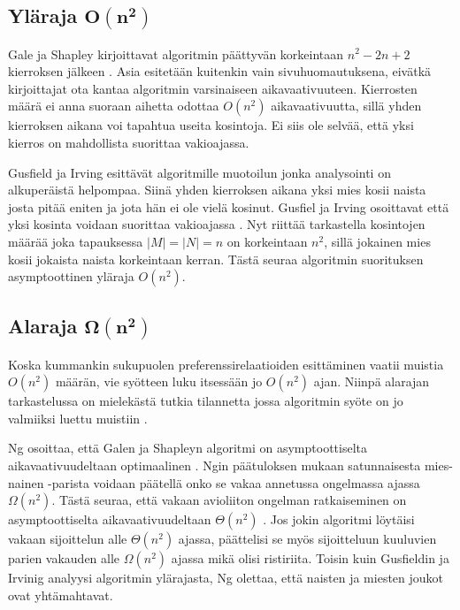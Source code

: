 \documentclass[gradu, twoside]{tktltiki}
\begin{document}
\subsection{Yläraja $\boldsymbol{O(n^2)}$}

Gale ja Shapley kirjoittavat algoritmin päättyvän korkeintaan $n^2 -
2n + 2$ kierroksen jälkeen \cite{galeshapley62}. Asia esitetään
kuitenkin vain sivuhuomautuksena, eivätkä kirjoittajat ota kantaa
algoritmin varsinaiseen aikavaativuuteen. Kierrosten määrä ei anna
suoraan aihetta odottaa $O(n^2)$ aikavaativuutta, sillä yhden
kierroksen aikana voi tapahtua useita kosintoja. Ei siis ole selvää,
että yksi kierros on mahdollista suorittaa
vakioajassa. \enlargethispage{\baselineskip}

Gusfield ja Irving esittävät algoritmille muotoilun \cite[sivu
  9]{gusfield89} jonka analysointi on alkuperäistä helpompaa. Siinä
yhden kierroksen aikana yksi mies kosii naista josta pitää eniten ja
jota hän ei ole vielä kosinut. Gusfiel ja Irving osoittavat että yksi
kosinta voidaan suorittaa vakioajassa \cite[sivu 14]{gusfield89}. Nyt
riittää tarkastella kosintojen määrää joka tapauksessa $|M| = |N| = n$
on korkeintaan $n^2$, sillä jokainen mies kosii jokaista naista
korkeintaan kerran. Tästä seuraa algoritmin suorituksen asymptoottinen
yläraja $O(n^2)$. \cite[sivu 14]{gusfield89}

\subsection{Alaraja $\boldsymbol{\Omega(n^2)}$}

Koska kummankin sukupuolen preferenssirelaatioiden esittäminen vaatii
muistia $O(n^2)$ määrän, vie syötteen luku itsessään jo $O(n^2)$ ajan.
Niinpä alarajan tarkastelussa on mielekästä tutkia tilannetta jossa
algoritmin syöte on jo valmiiksi luettu muistiin \cite{cheng89}.

Ng osoittaa, että Galen ja Shapleyn algoritmi on asymptoottiselta
aikavaativuudeltaan optimaalinen \cite{cheng89}. Ngin päätuloksen
mukaan satunnaisesta mies-nainen -parista voidaan päätellä onko se
vakaa annetussa ongelmassa ajassa $\Omega(n^2)$. Tästä seuraa, että
vakaan avioliiton ongelman ratkaiseminen on asymptoottiselta
aikavaativuudeltaan $\Theta(n^2)$ \cite{cheng89}. Jos jokin algoritmi
löytäisi vakaan sijoittelun alle $\Theta(n^2)$ ajassa, päättelisi se
myös sijoitteluun kuuluvien parien vakauden alle $\Omega(n^2)$ ajassa
mikä olisi ristiriita. Toisin kuin Gusfieldin ja Irvinig analyysi
algoritmin ylärajasta, Ng olettaa, että naisten ja miesten joukot ovat
yhtämahtavat.
\end{document}
